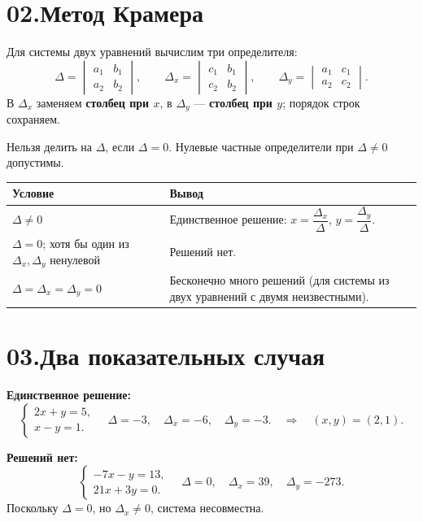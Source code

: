 \documentclass[a4paper,12pt]{article}
\newcommand{\subnote}[1]{{\color{softgray}\small #1}}
\begin{document}
\section*{\color{darkaccent}02.\quad Метод Крамера}
Для системы двух уравнений вычислим три определителя:
\[
\Delta=\begin{vmatrix}a_1&b_1\\a_2&b_2\end{vmatrix},\qquad
\Delta_x=\begin{vmatrix}c_1&b_1\\c_2&b_2\end{vmatrix},\qquad
\Delta_y=\begin{vmatrix}a_1&c_1\\a_2&c_2\end{vmatrix}.
\]
В $\Delta_x$ заменяем \textbf{столбец при $x$}, в $\Delta_y$ ---
\textbf{столбец при $y$}; порядок строк сохраняем.

\subnote{Нельзя делить на $\Delta$, если $\Delta=0$.
Нулевые частные определители при $\Delta\ne0$ допустимы.}

\begin{center}
\begin{tabularx}{\linewidth}{@{}p{46mm}X@{}}
\toprule
Условие & Вывод\\
\midrule
$\Delta\ne0$ & Единственное решение:
$x=\dfrac{\Delta_x}{\Delta}$,\enspace
$y=\dfrac{\Delta_y}{\Delta}$.\\[2mm]
$\Delta=0$; хотя бы один из $\Delta_x,\Delta_y$ ненулевой
& Решений нет.\\
$\Delta=\Delta_x=\Delta_y=0$ & Бесконечно много решений
(для системы из двух уравнений с двумя неизвестными).\\
\bottomrule
\end{tabularx}
\end{center}

\clearpage
\section*{\color{darkaccent}03.\quad Два показательных случая}
\textbf{Единственное решение:}
\[
\begin{cases}2x+y=5,\\x-y=1.\end{cases}
\quad
\Delta=-3,\quad\Delta_x=-6,\quad\Delta_y=-3.
\quad\Rightarrow\quad (x,y)=(2,1).
\]

\textbf{Решений нет:}
\[
\begin{cases}-7x-y=13,\\21x+3y=0.\end{cases}
\quad
\Delta=0,\quad\Delta_x=39,\quad\Delta_y=-273.
\]
Поскольку $\Delta=0$, но $\Delta_x\ne0$, система несовместна.
\end{document}
